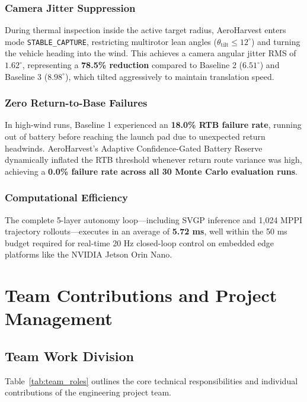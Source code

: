 \documentclass[12pt,a4paper,oneside]{report}
\begin{document}
\subsection{Camera Jitter Suppression}
During thermal inspection inside the active target radius, AeroHarvest enters mode \texttt{STABLE\_CAPTURE}, restricting multirotor lean angles ($\theta_{\text{tilt}} \le 12^\circ$) and turning the vehicle heading into the wind. This achieves a camera angular jitter RMS of \textbf{$1.62^\circ$}, representing a \textbf{78.5\% reduction} compared to Baseline 2 ($6.51^\circ$) and Baseline 3 ($8.98^\circ$), which tilted aggressively to maintain translation speed.

\subsection{Zero Return-to-Base Failures}
In high-wind runs, Baseline 1 experienced an \textbf{18.0\% RTB failure rate}, running out of battery before reaching the launch pad due to unexpected return headwinds. AeroHarvest's Adaptive Confidence-Gated Battery Reserve dynamically inflated the RTB threshold whenever return route variance was high, achieving a \textbf{0.0\% failure rate across all 30 Monte Carlo evaluation runs}.

\subsection{Computational Efficiency}
The complete 5-layer autonomy loop---including SVGP inference and 1,024 MPPI trajectory rollouts---executes in an average of \textbf{5.72 ms}, well within the 50 ms budget required for real-time 20 Hz closed-loop control on embedded edge platforms like the NVIDIA Jetson Orin Nano.

\chapter{Team Contributions and Project Management}

\section{Team Work Division}
Table~\ref{tab:team_roles} outlines the core technical responsibilities and individual contributions of the engineering project team.
\end{document}
